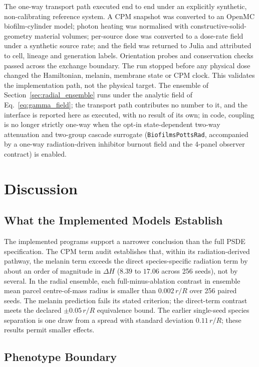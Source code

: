 \documentclass[11pt]{article}
\begin{document}
The one-way transport path executed end to end under an explicitly synthetic, non-calibrating
reference system. A CPM snapshot was converted to an OpenMC biofilm-cylinder model; photon heating
was normalised with constructive-solid-geometry material volumes; per-source dose was converted to a
dose-rate field under a synthetic source rate; and the field was returned to Julia and attributed to
cell, lineage and generation labels. Orientation probes and conservation checks passed across the
exchange boundary. The run stopped before any physical dose changed the Hamiltonian, melanin,
membrane state or CPM clock. This validates the implementation path, not the physical target. The
ensemble of Section~\ref{sec:radial_ensemble} runs under the analytic field of
Eq.~\ref{eq:gamma_field}; the transport path contributes no number to it, and the interface is
reported here as executed, with no result of its own; in code, coupling is no longer strictly one-way when the opt-in state-dependent two-way attenuation and two-group cascade surrogate (\texttt{BiofilmsPottsRad}, accompanied by a one-way radiation-driven inhibitor burnout field and the 4-panel observer contract) is enabled.

\section{Discussion}
\label{sec:discussion}

\subsection{What the Implemented Models Establish}

The implemented programs support a narrower conclusion than the full PSDE specification. The CPM term audit establishes that,
within its radiation-derived pathway, the melanin term exceeds the direct species-specific
radiation term by about an order of magnitude in $\Delta H$ ($8.39$ to $17.06$ across 256 seeds), not by several. In the radial ensemble, each full-minus-ablation contrast in
ensemble mean parcel centre-of-mass radius is smaller than $0.002\,r/R$ over 256 paired seeds.
The melanin prediction fails its stated criterion; the direct-term contrast meets the declared
$\pm0.05\,r/R$ equivalence bound. The earlier single-seed species separation is one draw from a
spread with standard deviation $0.11\,r/R$; these results permit smaller effects.

\subsection{Phenotype Boundary}
\end{document}
